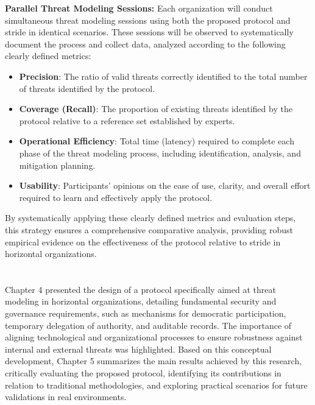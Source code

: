 \textbf{Parallel Threat Modeling Sessions:}
Each organization will conduct simultaneous threat modeling sessions using both
the proposed protocol and \gls{stride} in identical scenarios. These sessions
will be observed to systematically document the process and collect data,
analyzed according to the following clearly defined metrics:

\begin{itemize}
\item \textbf{Precision}: The ratio of valid threats correctly identified to the
total number of threats identified by the protocol.
\item \textbf{Coverage (Recall)}: The proportion of existing threats identified
by the protocol relative to a reference set established by experts.
\item \textbf{Operational Efficiency}: Total time (latency) required to complete
each phase of the threat modeling process, including identification, analysis,
and mitigation planning.
\item \textbf{Usability}: Participants' opinions on the ease of use, clarity,
and overall effort required to learn and effectively apply the protocol.
\end{itemize}

By systematically applying these clearly defined metrics and evaluation steps,
this strategy ensures a comprehensive comparative analysis, providing robust
empirical evidence on the effectiveness of the protocol relative to \gls{stride}
in horizontal organizations.

\section*{}
Chapter 4 presented the design of a protocol specifically aimed at
threat modeling in horizontal organizations, detailing fundamental security and
governance requirements, such as mechanisms for democratic participation,
temporary delegation of authority, and auditable records. The importance of
aligning technological and organizational processes to ensure robustness against
internal and external threats was highlighted. Based on this conceptual
development, Chapter 5 summarizes the main results achieved by this research,
critically evaluating the proposed protocol, identifying its contributions in
relation to traditional methodologies, and exploring practical scenarios for
future validations in real environments.
